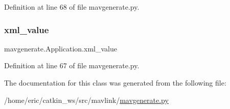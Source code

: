 Definition at line 68 of file mavgenerate.\+py.

\mbox{\label{classmavgenerate_1_1Application_a3ff48323bd54de5a059f8f1fc859d951}} 
\subsubsection{\texorpdfstring{xml\_value}{xml\_value}}
{\footnotesize\ttfamily mavgenerate.\+Application.\+xml\+\_\+value}



Definition at line 67 of file mavgenerate.\+py.



The documentation for this class was generated from the following file\+:\begin{DoxyCompactItemize}
\item 
/home/eric/catkin\+\_\+ws/src/mavlink/\mbox{\hyperlink{mavgenerate_8py}{mavgenerate.\+py}}\end{DoxyCompactItemize}

